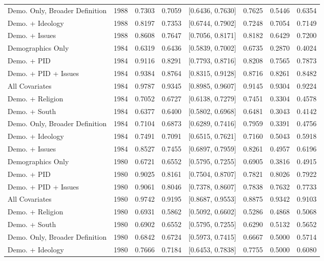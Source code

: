 \begin{longtable}{lrrrlrrr}
  Demo. Only, Broader Definition & 1988 & 0.7303 & 0.7059 & [0.6436, 0.7630] & 0.7625 & 0.5446 & 0.6354 \\ 
  Demo. + Ideology & 1988 & 0.8197 & 0.7353 & [0.6744, 0.7902] & 0.7248 & 0.7054 & 0.7149 \\ 
  Demo. + Issues & 1988 & 0.8608 & 0.7647 & [0.7056, 0.8171] & 0.8182 & 0.6429 & 0.7200 \\ 
  Demographics Only & 1984 & 0.6319 & 0.6436 & [0.5839, 0.7002] & 0.6735 & 0.2870 & 0.4024 \\ 
  Demo. + PID & 1984 & 0.9116 & 0.8291 & [0.7793, 0.8716] & 0.8208 & 0.7565 & 0.7873 \\ 
  Demo. + PID + Issues & 1984 & 0.9384 & 0.8764 & [0.8315, 0.9128] & 0.8716 & 0.8261 & 0.8482 \\ 
  All Covariates & 1984 & 0.9787 & 0.9345 & [0.8985, 0.9607] & 0.9145 & 0.9304 & 0.9224 \\ 
  Demo. + Religion & 1984 & 0.7052 & 0.6727 & [0.6138, 0.7279] & 0.7451 & 0.3304 & 0.4578 \\ 
  Demo. + South & 1984 & 0.6377 & 0.6400 & [0.5802, 0.6968] & 0.6481 & 0.3043 & 0.4142 \\ 
  Demo. Only, Broader Definition & 1984 & 0.7104 & 0.6873 & [0.6289, 0.7416] & 0.7959 & 0.3391 & 0.4756 \\ 
  Demo. + Ideology & 1984 & 0.7491 & 0.7091 & [0.6515, 0.7621] & 0.7160 & 0.5043 & 0.5918 \\ 
  Demo. + Issues & 1984 & 0.8527 & 0.7455 & [0.6897, 0.7959] & 0.8261 & 0.4957 & 0.6196 \\ 
  Demographics Only & 1980 & 0.6721 & 0.6552 & [0.5795, 0.7255] & 0.6905 & 0.3816 & 0.4915 \\ 
  Demo. + PID & 1980 & 0.9025 & 0.8161 & [0.7504, 0.8707] & 0.7821 & 0.8026 & 0.7922 \\ 
  Demo. + PID + Issues & 1980 & 0.9061 & 0.8046 & [0.7378, 0.8607] & 0.7838 & 0.7632 & 0.7733 \\ 
  All Covariates & 1980 & 0.9742 & 0.9195 & [0.8687, 0.9553] & 0.8875 & 0.9342 & 0.9103 \\ 
  Demo. + Religion & 1980 & 0.6931 & 0.5862 & [0.5092, 0.6602] & 0.5286 & 0.4868 & 0.5068 \\ 
  Demo. + South & 1980 & 0.6902 & 0.6552 & [0.5795, 0.7255] & 0.6290 & 0.5132 & 0.5652 \\ 
  Demo. Only, Broader Definition & 1980 & 0.6842 & 0.6724 & [0.5973, 0.7415] & 0.6667 & 0.5000 & 0.5714 \\ 
  Demo. + Ideology & 1980 & 0.7666 & 0.7184 & [0.6453, 0.7838] & 0.7755 & 0.5000 & 0.6080 \\ 

\end{longtable}
